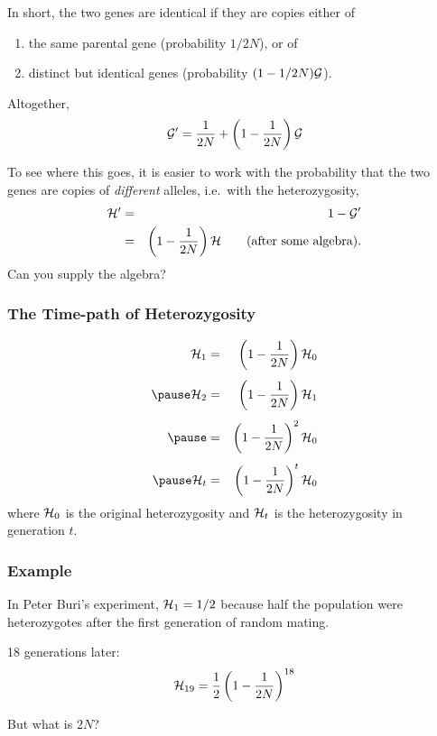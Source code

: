 \begin{frame}
In short, the two genes are identical if they are copies either of
\begin{enumerate}
\item the same parental gene (probability $1/2N$), or of
\item distinct but identical genes (probability $(1 - 1/2N)\mathcal{G}$).
\end{enumerate}
Altogether,
\[
\mathcal{G}' = \frac{1}{2N} + \left(1 - \frac{1}{2N}\right) \mathcal{G}
\]
\end{frame}

\begin{frame}
To see where this goes, it is easier to work with the probability that the two
genes are copies of \emph{different} alleles, i.e.\ with the heterozygosity,
\begin{eqnarray*}
\mathcal{H}' &=& 1-\mathcal{G}'\\
&=& \left(1 - \frac{1}{2N}\right)\mathcal{H} \qquad \mbox{(after some algebra).}\\
\end{eqnarray*}
Can you supply the algebra?
\end{frame}

\begin{frame}
\frametitle{The Time-path of Heterozygosity}
\begin{eqnarray*}
\Het_1 &=& \left(1 - \frac{1}{2N}\right)\Het_0\\[4pt]
\pause
\Het_2 &=& \left(1 - \frac{1}{2N}\right)\Het_1\\[4pt]
\pause
       &=& \left(1 - \frac{1}{2N}\right)^2\Het_0\\[4pt]
\pause
\Het_t &=& \left(1 - \frac{1}{2N}\right)^t\Het_0\\
\end{eqnarray*}
where $\mathcal{H}_0$ is the original heterozygosity and $\mathcal{H}_t$ is the
heterozygosity in generation $t$.
\end{frame}

\begin{frame}
\frametitle{Example}
In Peter Buri's experiment, $\mathcal{H}_1=1/2$ because half the population were
heterozygotes after the first generation of random mating.

18 generations later:
\[
\mathcal{H}_{19} = \frac{1}{2} \left(1 - \frac{1}{2N}\right)^{18}
\]

But what is $2N$?
\end{frame}

